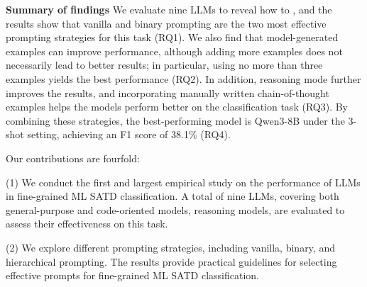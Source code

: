 \documentclass[acmsmall,screen,review,anonymous]{acmart}
\begin{document}
\textbf{Summary of findings} We evaluate nine LLMs to reveal how to , and the results show that vanilla and binary prompting are the two most effective prompting strategies for this task (RQ1). We also find that model-generated examples can improve performance, although adding more examples does not necessarily lead to better results; in particular, using no more than three examples yields the best performance (RQ2). In addition, reasoning mode further improves the results, and incorporating manually written chain-of-thought examples helps the models perform better on the classification task (RQ3). By combining these strategies, the best-performing model is Qwen3-8B under the 3-shot setting, achieving an F1 score of 38.1\% (RQ4).











Our contributions are fourfold:

(1) We conduct the first and largest empirical study on the performance of LLMs in fine-grained ML SATD classification. A total of nine LLMs, covering both general-purpose and code-oriented models, reasoning models, are evaluated to assess their effectiveness on this task.

(2) We explore different prompting strategies, including vanilla, binary, and hierarchical prompting. The results provide practical guidelines for selecting effective prompts for fine-grained ML SATD classification.
\end{document}
